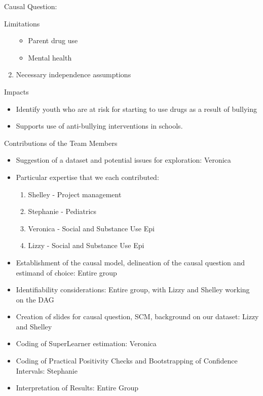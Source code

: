 \documentclass[ignorenonframetext,]{beamer}
\begin{document}
\begin{frame}{Causal Question:}
\begin{block}{Limitations}
\begin{enumerate}
  \begin{itemize}
   \item Parent drug use 
   \item Mental health 
     \end{itemize}
\item
  Necessary independence assumptions
\end{enumerate}

\end{block}

\begin{block}{Impacts}

\begin{itemize}
\item
  Identify youth who are at risk for starting to use drugs as a result
  of bullying
\item
  Supports use of anti-bullying interventions in schools.
\end{itemize}

\end{block}

\begin{block}{Contributions of the Team Members}

\begin{itemize}
\item
  Suggestion of a dataset and potential issues for exploration: Veronica
\item
  Particular expertise that we each contributed:

  \begin{enumerate}
   \item Shelley - Project management
   \item Stephanie - Pediatrics 
   \item Veronica - Social and Substance Use Epi
   \item Lizzy - Social and Substance Use Epi
     \end{enumerate}
\item
  Establishment of the causal model, delineation of the causal question
  and estimand of choice: Entire group
\item
  Identifiability considerations: Entire group, with Lizzy and Shelley
  working on the DAG
\item
  Creation of slides for causal question, SCM, background on our
  dataset: Lizzy and Shelley
\item
  Coding of SuperLearner estimation: Veronica
\item
  Coding of Practical Positivity Checks and Bootstrapping of Confidence
  Intervals: Stephanie
\item
  Interpretation of Results: Entire Group
\end{itemize}

\end{block}

\end{frame}
\end{document}
